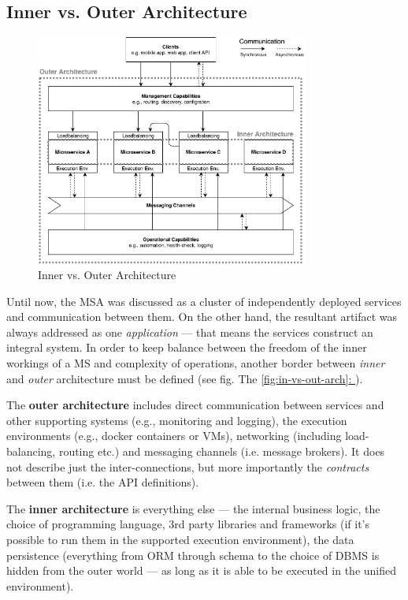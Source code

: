 \documentclass[thesis=M,english,hidelinks]{FITthesis}[2012/10/20]
\newcommand*{\fullref}[1]{\hyperref[{#1}]{\autoref*{#1}: \textit{\nameref*{#1}}}}
\begin{document}
\subsection{Inner vs. Outer Architecture}

\begin{figure}
  \centering
    \includegraphics[width=0.8\textwidth]{images/architecture_inner_vs_outer.pdf}
    \caption{Inner vs. Outer Architecture}
  \label{fig:in-vs-out-arch}
\end{figure}

Until now, the \acrshort{MSA} was discussed as a cluster of independently deployed services and communication between them. On the other hand, the resultant artifact was always addressed as one \textit{application} --- that means the services construct an integral system. In order to keep balance between the freedom of the inner workings of a \acrshort{MS} and complexity of operations, another border between \textit{inner} and \textit{outer} architecture must be defined (see fig. The \fullref{fig:in-vs-out-arch}).

The \textbf{outer architecture} includes direct communication between services and other supporting systems (e.g., monitoring and logging), the execution environments (e.g., docker containers or \acrshort{VM}s), networking (including load-balancing, routing etc.) and messaging channels (i.e. message brokers). It does not describe just the inter-connections, but more importantly the \textit{contracts} between them (i.e. the \acrshort{API} definitions). 

The \textbf{inner architecture} is everything else --- the internal business logic, the choice of programming language, 3rd party libraries and frameworks (if it's possible to run them in the supported execution environment), the data persistence (everything from \acrshort{ORM} through schema to the choice of \acrshort{DBMS} is hidden from the outer world --- as long as it is able to be executed in the unified environment).
\end{document}
